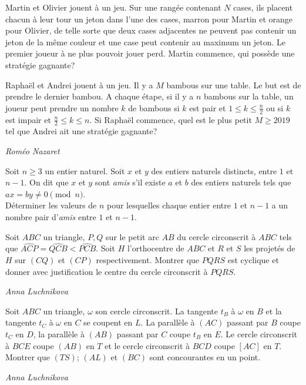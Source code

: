 
\begin{exo}{}
Martin et Olivier jouent à un jeu. Sur une rangée contenant $N$ cases, ils placent chacun à leur tour un jeton dans l'une des cases, marron pour Martin et orange pour Olivier, de telle sorte que deux cases adjacentes ne peuvent pas contenir un jeton de la même couleur et une case peut contenir au maximum un jeton. Le premier joueur à ne plus pouvoir jouer perd. Martin commence, qui possède une stratégie gagnante?
\end{exo}


\begin{exo}{}
Raphaël et Andrei jouent à un jeu. Il y a $M$ bambous sur une table. Le but est de prendre le dernier bambou. A chaque étape, si il y a $n$ bambous sur la table, un joueur peut prendre un nombre $k$ de bambous si $k$ est pair et $1\le k\le \frac{n}{2}$ ou si $k$ est impair et $\frac{n}{2}\le k\le n$. Si Raphaël commence, quel est le plus petit $M\ge 2019$ tel que Andrei ait une stratégie gagnante?

\medskip
\textit{Roméo Nazaret}
\end{exo}


\begin{exo}{}
Soit $n\ge 3$ un entier naturel.
Soit $x$ et $y$ des entiers naturels distincts, entre $1$ et $n-1$. On dit que $x$ et $y$ sont \textit{amis} s'il existe $a$ et $b$ des entiers naturels tels que $ax=by \ne 0\pmod n$. \\
Déterminer les valeurs de $n$ pour lesquelles chaque entier entre $1$ et $n-1$ a un nombre pair d'\textit{amis} entre $1$ et $n-1$.

\end{exo}

\begin{exo}{}
Soit $ABC$ un triangle, $P,Q$ sur le petit arc $AB$ du cercle circonscrit à $ABC$ tels
que $\widehat{ACP} =\widehat{QCB} <\widehat{PCB}$. Soit $H$ l’orthocentre de $ABC$ et $R$ et $S$ les projetés de $H$ sur $(CQ)$
et $(CP)$ respectivement. Montrer que $PQRS$ est cyclique et donner avec justification le centre
du cercle circonscrit à $PQRS$.

\medskip
\textit{Anna Luchnikova}

\end{exo}



\begin{exo}{}
Soit $ABC$ un triangle, $\omega $ son cercle circonscrit. La tangente $t_B$ à $\omega$ en $B$ et la tangente $t_C$
à $\omega$ en $C$ se coupent en $L$. La parallèle à $(AC)$ passant par $B$ coupe $t_C$ en $D$, la parallèle à
$(AB)$ passant par $C$ coupe $t_B$ en $E$. Le cercle circonscrit à $BCE$ coupe $(AB)$ en $T$ et le cercle
circonscrit à $BCD$ coupe $[AC]$ en $T$. \\
Montrer que $(TS)$; $(AL)$ et $(BC)$ sont concourantes en un
point.

\medskip
\textit{Anna Luchnikova}

\end{exo}



